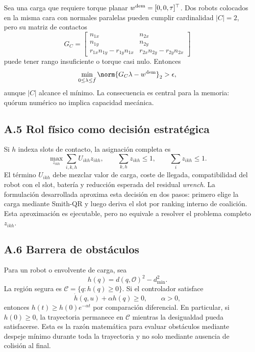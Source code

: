 Sea una carga que requiere torque planar $w^{\rm dem}=[0,0,\tau]^\top$. Dos robots
colocados en la misma cara con normales paralelas pueden cumplir cardinalidad
$|C|=2$, pero su matriz de contactos
\[
  G_C=\begin{bmatrix}
  n_{1x} & n_{2x}\\
  n_{1y} & n_{2y}\\
  r_{1x}n_{1y}-r_{1y}n_{1x} &
  r_{2x}n_{2y}-r_{2y}n_{2x}
  \end{bmatrix}
\]
puede tener rango insuficiente o torque casi nulo. Entonces
\[
  \min_{0\le \lambda\le \bar f}\norm{G_C\lambda-w^{\rm dem}}_2>\epsilon ,
\]
aunque $|C|$ alcance el mínimo. La consecuencia es central para la memoria: quórum
numérico no implica capacidad mecánica.

\subsection*{A.5 Rol físico como decisión estratégica}

Si $h$ indexa slots de contacto, la asignación completa es
\[
  \max_{z_{ikh}}\sum_{i,k,h} U_{ikh}z_{ikh},
  \qquad
  \sum_{k,h}z_{ikh}\le 1,\qquad
  \sum_i z_{ikh}\le 1 .
\]
El término $U_{ikh}$ debe mezclar valor de carga, coste de llegada, compatibilidad del
robot con el slot, batería y reducción esperada del residual \emph{wrench}. La
formulación desarrollada aproxima esta decisión en dos pasos: primero elige la carga
mediante Smith-QR y luego deriva el slot por ranking interno de coalición. Esta
aproximación es ejecutable, pero no equivale a resolver el problema completo
$z_{ikh}$.

\subsection*{A.6 Barrera de obstáculos}

Para un robot o envolvente de carga, sea
\[
  h(q)=d(q,\mathcal O)^2-d_{\min}^2 .
\]
La región segura es $\mathcal C=\{q:h(q)\geq 0\}$. Si el controlador satisface
\[
  \dot h(q,u)+\alpha h(q)\geq 0,\qquad \alpha>0,
\]
entonces $h(t)\geq h(0)e^{-\alpha t}$ por comparación diferencial. En particular, si
$h(0)\geq0$, la trayectoria permanece en $\mathcal C$ mientras la desigualdad pueda
satisfacerse. Esta es la razón matemática para evaluar obstáculos mediante despeje
mínimo durante toda la trayectoria y no solo mediante ausencia de colisión al final.

